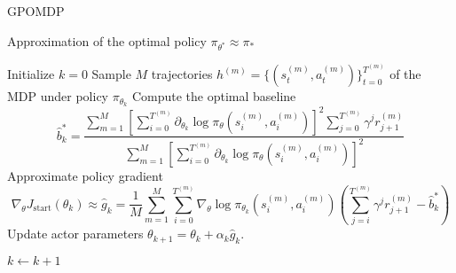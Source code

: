 \begin{algorithm}[t]
	\caption{GPOMDP}
	\label{algo:GPOMDP}
	\begin{algorithmic}[0]
		\Ensure Approximation of the optimal policy $\pi_{\theta^*} \approx \pi_*$
		\begin{algorithmic}[1]
		\State Initialize $k = 0$
		\Repeat
			\State Sample $M$ trajectories $h^{(m)} = \{(s_t^{(m)}, a_t^{(m)})\}_{t = 0}^{T^{(m)}}$ of the MDP under policy $\pi_{\theta_k}$
			\State Compute the optimal baseline 
			\begin{equation}
				\widehat{b}_k^* = \frac{\sum^{M}_{m=1} \left[ \sum_{i=0}^{T^{(m)}} 
									\partial_{\theta_k} \log \pi_\theta\left(s_i^{(m)}, a_i^{(m)}\right) \right]^2 
									\sum^{T^{(m)}}_{j=0} \gamma^j r_{j+1}^{(m)}}{\sum^{M}_{m=1} \left[ \sum_{i=0}^{T^{(m)}} \partial_{\theta_k} \log \pi_\theta\left(s_i^{(m)}, a_i^{(m)}\right) \right]^2}
			\end{equation}
			\State Approximate policy gradient
			\begin{equation}
				\nabla_\theta J_{\text{start}}(\theta_k) \approx \widehat{g}_k = \frac{1}{M} \sum^{M}_{m=1} \sum_{i=0}^{T^{(m)}} 
					\nabla_\theta \log \pi_{\theta_k}\left(s_i^{(m)}, a_i^{(m)}\right) \left( 
					\sum^{T^{(m)}}_{j=i} \gamma^j r_{j+1}^{(m)} - \widehat{b}_k^* \right)
			\end{equation}
			\State Update actor parameters $\theta_{k+1} = \theta_k + \alpha_k \widehat{g}_k $. 
			
			\State $k \leftarrow k + 1$
		\end{algorithmic}
	\end{algorithmic}
\end{algorithm}

